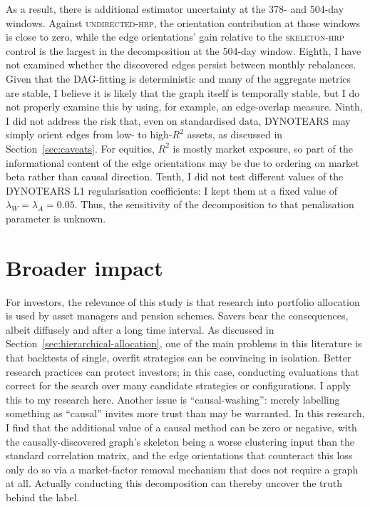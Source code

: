 \documentclass[11pt, a4paper]{report}
\newcommand{\skelhrp}{\textsc{skeleton-hrp}}
\newcommand{\undirhrp}{\textsc{undirected-hrp}}
\begin{document}
As a result, there is additional estimator uncertainty at the 378- and 504-day
windows. Against \undirhrp{}, the orientation contribution at those windows is close to zero, while the edge orientations' gain relative to the \skelhrp{} control is the largest in the decomposition at the 504-day window. 
Eighth, I have not examined whether the discovered edges persist between monthly rebalances.
Given that the DAG-fitting is deterministic and many of the aggregate metrics are stable, I believe it is likely that the graph itself is temporally stable, but I do not properly examine this by using, for example, an edge-overlap measure.
Ninth, I did not address the risk that, even on standardised data, DYNOTEARS may simply
orient edges from low- to high-$R^2$ assets, as discussed in Section~\ref{sec:caveats}. 
For equities, $R^2$ is mostly market exposure, so part of the informational content of the edge orientations may be due to ordering on market beta rather than causal direction.
Tenth, I did not test different values of the DYNOTEARS L1 regularisation coefficients: I kept them at a fixed value of $\lambda_W=\lambda_A=0.05$. Thus, the sensitivity of the decomposition to that penalisation parameter is unknown.

\section{Broader impact}
\label{sec:impact}

For investors, the relevance of this study is that research into portfolio allocation is used by asset managers and pension schemes. Savers bear the consequences, albeit diffusely and after a long time interval. 
As discussed in Section~\ref{sec:hierarchical-allocation}, one of the main problems in this literature is that backtests of single, overfit strategies can be convincing in isolation.
Better research practices can protect investors; in this case, conducting evaluations that correct for the search over many candidate strategies or configurations. I apply this to my research here. 
Another issue is ``causal-washing'': merely labelling something as ``causal'' invites more trust than may be warranted. In this research, I find that the additional value of a causal method can be zero or negative, with the causally-discovered graph's skeleton being a worse clustering input than the standard correlation matrix, and the edge orientations that counteract this loss only do so via a market-factor removal mechanism that does not require a graph at all.
Actually conducting this decomposition can thereby uncover the truth behind the label.
\end{document}
